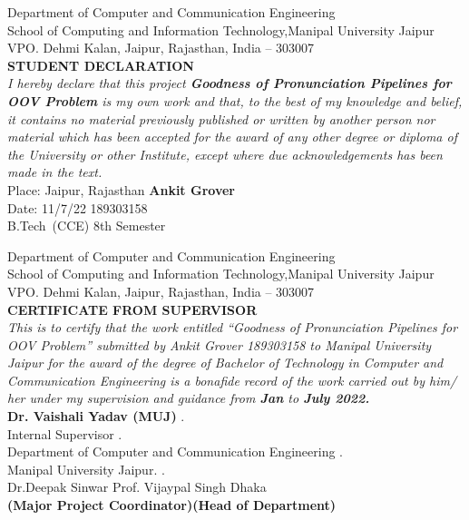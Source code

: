 \documentclass[letterpaper,12pt]{article}
\begin{document}
\begin{center}
    \normalsize{Department of Computer and Communication Engineering \\School of Computing and Information Technology,Manipal University Jaipur \\VPO. Dehmi Kalan, Jaipur, Rajasthan, India – 303007}\\[0.5 in]
    
    \Large \textbf{STUDENT DECLARATION }\\[0.5 in]
    
    \normalsize{\textit{I hereby declare that this project \textbf{Goodness of Pronunciation Pipelines for OOV Problem} is my own work and that, to the best of my knowledge and belief, it contains no 
material previously published or written by another person nor material which has been 
accepted for the award of any other degree or diploma of the University or other Institute, 
except where due acknowledgements has been made in the text.
}}\\[1 in]

\large{Place: Jaipur, Rajasthan       \hfill         \textbf{Ankit Grover}}\\
\large{Date: 11/7/22      \hfill         189303158}\\
\large{\hfill B.Tech\ (CCE) 8th Semester
}\\

\end{center}

\pagebreak

\begin{center}
    \normalsize{Department of Computer and Communication Engineering \\School of Computing and Information Technology,Manipal University Jaipur \\VPO. Dehmi Kalan, Jaipur, Rajasthan, India – 303007}\\[0.5 in]
    
    \Large \textbf{CERTIFICATE FROM SUPERVISOR}\\[0.5 in]
    
    \normalsize{\textit{This is to certify that the work entitled “Goodness of Pronunciation Pipelines for OOV Problem” submitted by Ankit Grover 189303158 to Manipal University Jaipur for the award 
of the degree of Bachelor of Technology in Computer and Communication Engineering is a 
bonafide record of the work carried out by him/ her under my supervision and guidance from \textbf{Jan} to \textbf{July 2022.}
}}\\[1 in]

\large{\textbf{Dr. Vaishali Yadav (MUJ)} \hfill .\\Internal Supervisor \hfill .\\ Department of Computer and Communication Engineering \hfill .\\ Manipal University Jaipur. \hfill.}\\[1 in]
\large{Dr.Deepak Sinwar     \hfill         Prof. Vijaypal Singh Dhaka}\\
\large{\textbf{(Major Project Coordinator)}\hfill \textbf{(Head of Department)}
}\\

\end{center}
\end{document}

